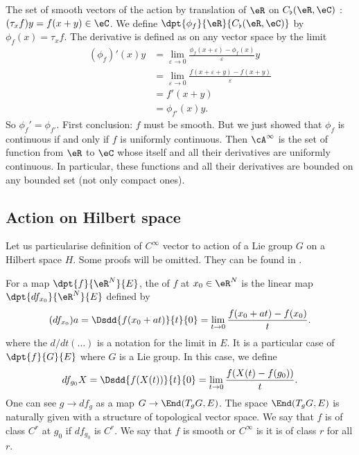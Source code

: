 \begin{example}
 The set of smooth vectors of the action by translation of $\eR$ on $ C_{\flat}(\eR,\eC)$ : $(\tau_xf)y=f(x+y)\in\eC$. We define $\dpt{\phi_f}{\eR}{C_{\flat}(\eR,\eC)}$ by $\phi_f(x)=\tau_xf$. The derivative is defined as on any vector space by the limit
\begin{equation}
\begin{split}
   (\phi_f)'(x)y&=\lim_{\varepsilon\to 0}\frac{\phi_f(x+\varepsilon)-\phi_f(x)}{\varepsilon}y\\
                &=\lim_{\varepsilon\to 0}\frac{f(x+\varepsilon+y)-f(x+y)}{\varepsilon}\\
                &=f'(x+y)\\
                &=\phi_{f'}(x)y.
\end{split}
\end{equation}
So $\phi_f'=\phi_{f'}$. First conclusion: $f$ must be smooth. But we just showed that $\phi_f$ is continuous if and only if $f$ is uniformly continuous. Then $\cA^{\infty}$ is the set of function from $\eR$ to $\eC$ whose itself and all their derivatives are uniformly continuous. In particular, these functions and all their derivatives are bounded on any bounded set (not only compact ones).

\end{example}

\subsection{Action on Hilbert space}

Let us particularise definition of $ C^{\infty}$ vector to action of a Lie group $G$ on a Hilbert space $H$. Some proofs will be omitted. They can be found in \cite{Knapp_reprez}.

For a map $\dpt{f}{\eR^N}{E}$, the  of $f$ at $x_0\in\eR^N$ is the linear map $\dpt{df_{x_0}}{\eR^N}{E}$ defined by
\begin{equation}
(df_{x_0})a=\Dsdd{ f(x_0+at) }{t}{0}=\lim_{t\to 0}\frac{f(x_0+at)-f(x_0)}{t}.
\end{equation}
where the $d/dt(\ldots)$ is a notation for the limit in $E$. It is a particular case of $\dpt{f}{G}{E}$ where $G$ is a Lie group. In this case, we define
\begin{equation}
  df_{g_0}X=\Dsdd{ f(X(t)) }{t}{0}=\lim_{t\to 0}\frac{f(X(t)-f(g_0))}{t}.
\end{equation}
One can see $g\to df_g$ as a map $G\to \End(T_gG,E)$. The space $\End(T_gG,E)$ is naturally given with a structure of topological vector space. We say that $f$ is of class $C^r$ at $g_0$ if $df_{g_0}$ is $C^r$. We say that $f$ is smooth or $ C^{\infty}$ is it is of class $r$ for all $r$.

